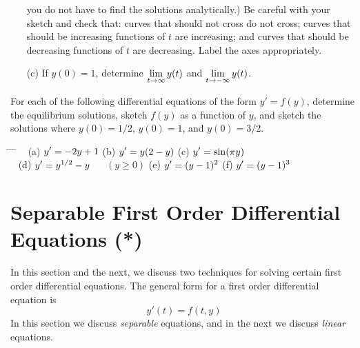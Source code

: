 \begin{exercises}
\begin{exercise}
\begin{enumerate}
you do not have to find the solutions analytically.)
Be careful with your sketch and check that:
curves that should not cross do not
cross; curves that should be increasing functions of $t$
are increasing; and curves that should be decreasing functions
of $t$ are decreasing. Label the axes appropriately.
\item[(c)] If $y(0) = 1$, determine $\displaystyle \lim_{t \rightarrow \infty} y(t)$
and $\displaystyle \lim_{t\rightarrow -\infty} y(t)$.
\end{enumerate}
\end{exercise}
\begin{exercise}
For each of the following differential equations
of the form $y' = f(y)$,
determine the equilibrium solutions, sketch $f(y)$ as a function
of $y$, and sketch the solutions where $y(0)=1/2$, $y(0)=1$, and
$y(0)=3/2$.
\begin{tabbing}
\hspace*{0.25in} \= \hspace*{1.75in} \= \hspace*{1.5in} \= \kill
~ \> 
(a) $\displaystyle y' = -2y + 1$ \>
(b) $\displaystyle y' = y(2-y)$ \>
(c) $\displaystyle y' = \sin(\pi y)$ \\[2pt]
~ \>
(d) $\displaystyle y' = y^{1/2} - y$ ~~ $(y \ge 0)$ \>
(e) $\displaystyle y' = (y-1)^2$ \>
(f) $\displaystyle y' = (y-1)^3$
\end{tabbing}
\end{exercise}
\end{exercises}

\newpage

\section{Separable First Order Differential Equations (*)}

In this section and the next, we discuss
two techniques for solving certain first order
differential equations.
The general form for a first order differential equation is
\begin{equation}
   y'(t) = f(t,y)
\end{equation}
In this section we discuss \emph{separable} equations,
and in the next we discuss \emph{linear} equations.

